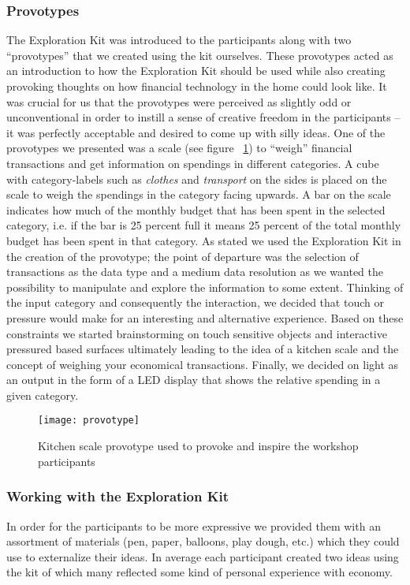 \subsubsection*{Provotypes}
The Exploration Kit was introduced to the participants along with two “provotypes” \cite{boer2012provotypes} that we created using the kit ourselves. These provotypes acted as an introduction to how the Exploration Kit should be used while also creating provoking thoughts on how financial technology in the home could look like. It was crucial for us that the provotypes were perceived as slightly odd or unconventional in order to instill a sense of creative freedom in the participants -- it was perfectly acceptable and desired to come up with silly ideas. One of the provotypes we presented was a scale (see figure ~\ref{fig:provotype}) to “weigh” financial transactions and get information on spendings in different categories. A cube with category-labels such as \emph{clothes} and \emph{transport} on the sides is placed on the scale to weigh the spendings in the category facing upwards. A bar on the scale indicates how much of the monthly budget that has been spent in the selected category, i.e. if the bar is 25 percent full it means 25 percent of the total monthly budget has been spent in that category. As stated we used the Exploration Kit in the creation of the provotype; the point of departure was the selection of transactions as the data type and a medium data resolution as we wanted the possibility to manipulate and explore the information to some extent. Thinking of the input category and consequently the interaction, we decided that touch or pressure would make for an interesting and alternative experience. Based on these constraints we started brainstorming on touch sensitive objects and interactive pressured based surfaces ultimately leading to the idea of a kitchen scale and the concept of weighing your economical transactions. Finally, we decided on light as an output in the form of a LED display that shows the relative spending in a given category.

\begin{figure}[!h]
	\centering
	\texttt{[image: provotype]}
	\caption{Kitchen scale provotype used to provoke and inspire the workshop participants}
	\label{fig:provotype}
\end{figure}

\subsubsection*{Working with the Exploration Kit}
In order for the participants to be more expressive we provided them with an assortment of materials (pen, paper, balloons, play dough, etc.) which they could use to externalize their ideas. In average each participant created two ideas using the kit of which many reflected some kind of personal experience with economy.


